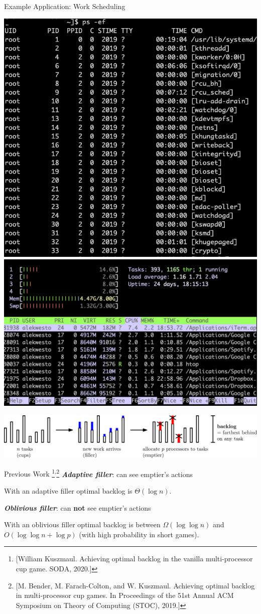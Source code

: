 \documentclass[xcolor=x11names, svgnames, rgb]{beamer}
\newcommand{\defn}[1]       {{\textit{\textbf{\boldmath #1}}}}
\begin{document}
\begin{frame}[t]{Example Application: Work Scheduling}
  \begin{center}
  \includegraphics[width=0.36\linewidth]{ps-ef/ps-ef.png}
  \includegraphics[width=0.62\linewidth]{ps-ef/work_scheduling.png}
  \end{center}
  \includegraphics[width=\linewidth]{workScheduling/workScheduling.eps}
\end{frame}

\begin{frame}[t]{Previous Work \footnote{[William Kuszmaul. Achieving optimal backlog in the vanilla multi-processor cup game. SODA, 2020.]}\textsuperscript{,}\footnote{[M. Bender, M. Farach-Colton, and W. Kuszmaul. Achieving optimal backlog in multi-processor cup games. In Proceedings of the 51st Annual ACM Symposium on Theory of Computing (STOC), 2019.]}}
  \defn{Adaptive filler}: can see emptier's actions
  \begin{theorem}
    With an adaptive filler optimal backlog is
    $\Theta(\log n)$.
  \end{theorem}

  \defn{Oblivious filler}: can \textbf{not} see emptier's actions
  \begin{theorem}
    With an oblivious filler optimal backlog is between $\Omega(\log \log n)$ and $O(\log\log n + \log p)$ (with high probability in short games).
  \end{theorem}

\end{frame}
\end{document}
